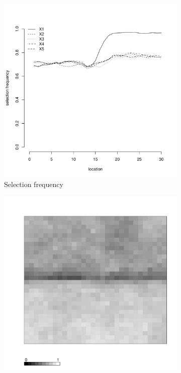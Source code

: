 \documentclass[authoryear, review, 11pt]{elsarticle}
\begin{document}
\begin{figure}
\begin{subfigure}[b]{0.45\textwidth}
		\includegraphics[width=\textwidth]{../../figures/simulation/15.23.profile_selection.pdf}
		\caption{Selection frequency}
	\end{subfigure}
	\begin{subfigure}[b]{0.45\textwidth}
	\centering
		\includegraphics[width=\textwidth]{../../figures/simulation/X1.15.23.unshrunk_bootstrap_coverage.pdf}

\end{subfigure}
\end{figure}
\end{document}
